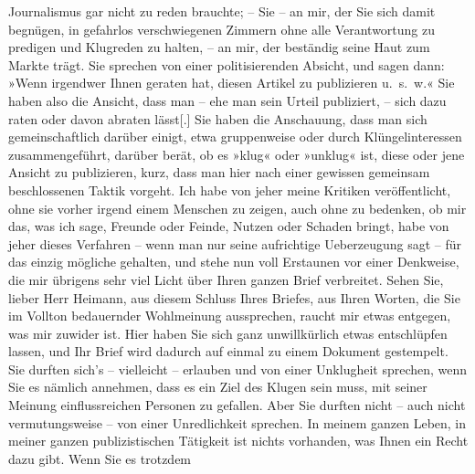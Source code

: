 \begin{ledgroupsized}[t]{13cm}
               Journalismus gar nicht zu reden brauchte; – Sie – an mir, der Sie sich damit
               begnügen, in gefahrlos verschwiegenen Zimmern ohne alle Verantwortung zu pre{\pb}digen und Klugreden zu halten, –
               an mir, der beständig seine Haut zum Markte trägt.\pend
           \pstart
           Sie sprechen von einer politisierenden Absicht, und sagen dann: »Wenn irgendwer Ihnen
               geraten hat, diesen Artikel zu publizieren u. s. w.« Sie haben also die Ansicht, dass
               man – ehe man sein Urteil publiziert, – sich dazu raten oder davon abraten
                  lässt{[}.{]} Sie haben die Anschauung, dass man sich
               gemeinschaftlich darüber einigt, etwa gruppenweise oder durch Klüngelinteressen
               zusammengeführt, darüber berät, ob es »klug« oder »unklug« ist, diese oder jene
               Ansicht zu publizieren, kurz, dass man hier nach einer gewissen gemeinsam
               beschlossenen Taktik vorgeht.\pend
           \pstart
           Ich habe von jeher meine Kritiken veröffentlicht, ohne sie vorher irgend einem
               Menschen zu zeigen, auch ohne zu bedenken, ob mir das, was ich sage, Freunde oder
               Feinde, Nutzen oder Schaden bringt, habe von jeher dieses Verfahren – wenn man nur
               seine aufrichtige Ueberzeugung sagt – für das einzig mögliche gehalten, und stehe nun
               voll Erstaunen vor einer Denkweise, die mir übrigens sehr viel Licht über Ihren
               ganzen Brief verbreitet.\pend
           \pstart
           Sehen Sie, lieber Herr Heimann, aus diesem
               Schluss Ihres Briefes, aus Ihren Worten, die Sie im Vollton bedauernder Wohlmeinung
               aussprechen, raucht mir etwas entgegen, was mir zuwider ist. Hier haben Sie sich ganz unwillkürlich etwas
               entschlüpfen lassen, und Ihr Brief wird dadurch auf einmal zu einem Dokument
               gestempelt.\pend
           \pstart
           Sie durften sich’s – vielleicht – erlauben und von einer Unklugheit sprechen, wenn
               Sie es nämlich annehmen, dass es ein Ziel des Klugen sein muss, mit seiner Meinung
               einflussreichen Personen zu gefallen. Aber Sie durften nicht – auch nicht
               vermutungsweise – von einer Unredlichkeit sprechen. In meinem ganzen Leben, in mei{\pb}ner ganzen publizistischen
               Tätigkeit ist nichts vorhanden, was Ihnen ein Recht dazu gibt. Wenn Sie es trotzdem

\end{ledgroupsized}
